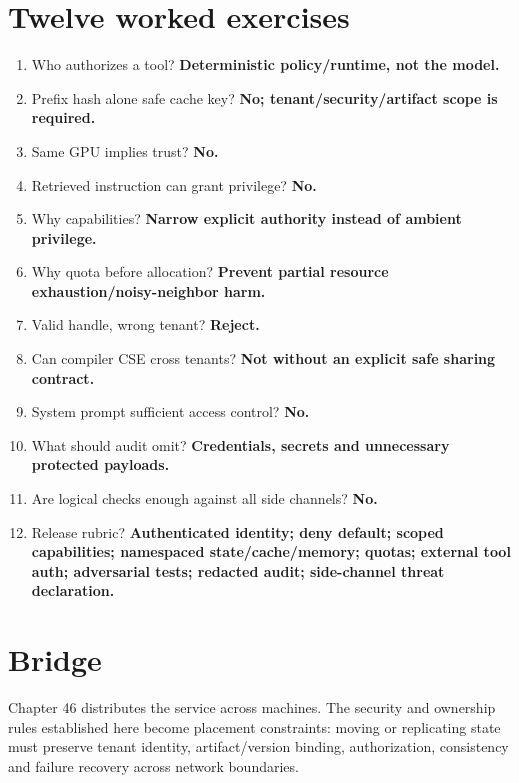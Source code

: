 \section{Twelve worked exercises}
\begin{enumerate}
\item Who authorizes a tool? \textbf{Deterministic policy/runtime, not the model.}
\item Prefix hash alone safe cache key? \textbf{No; tenant/security/artifact scope is required.}
\item Same GPU implies trust? \textbf{No.}
\item Retrieved instruction can grant privilege? \textbf{No.}
\item Why capabilities? \textbf{Narrow explicit authority instead of ambient privilege.}
\item Why quota before allocation? \textbf{Prevent partial resource exhaustion/noisy-neighbor harm.}
\item Valid handle, wrong tenant? \textbf{Reject.}
\item Can compiler CSE cross tenants? \textbf{Not without an explicit safe sharing contract.}
\item System prompt sufficient access control? \textbf{No.}
\item What should audit omit? \textbf{Credentials, secrets and unnecessary protected payloads.}
\item Are logical checks enough against all side channels? \textbf{No.}
\item Release rubric? \textbf{Authenticated identity; deny default; scoped capabilities; namespaced state/cache/memory; quotas; external tool auth; adversarial tests; redacted audit; side-channel threat declaration.}
\end{enumerate}

\section{Bridge}
Chapter 46 distributes the service across machines. The security and ownership rules established here become placement constraints: moving or replicating state must preserve tenant identity, artifact/version binding, authorization, consistency and failure recovery across network boundaries.

